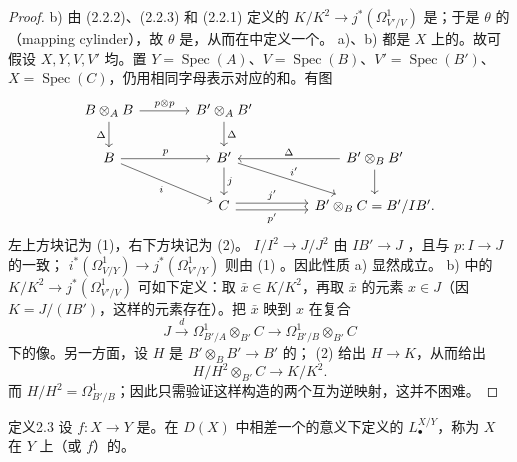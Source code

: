 \begin{proof}
b) 由 (2.2.2)、(2.2.3) 和 (2.2.1) 定义的 $K/K^2\to j^*(\Omega^1_{V'/V})$ 是；于是 $\theta$ 的（mapping cylinder），故 $\theta$ 是，从而在中定义一个。
a)、b) 都是 $X$ 上的。故可假设 $X,Y,V,V'$ 均。置 $Y=\operatorname{Spec}(A)$、$V=\operatorname{Spec}(B)$、$V'=\operatorname{Spec}(B')$、$X=\operatorname{Spec}(C)$，仍用相同字母表示对应的和。有图
\[
\begin{tikzcd}[column sep=large]
B\otimes_AB\arrow[r,"p\otimes p"]\arrow[d,"\Delta"']&B'\otimes_AB'\arrow[d,"\Delta"]\\
B\arrow[r,"p"]\arrow[dr,"i"']&B'\arrow[d,"j"]\arrow[dr,"i'"]&B'\otimes_BB'\arrow[l,"\Delta"']\arrow[d]\\
&C\arrow[r,"j'",shift left]\arrow[r,"p'"',shift right]&B'\otimes_BC=B'/IB'.
\end{tikzcd}
\]
左上方块记为 (1)，右下方块记为 (2)。 $I/I^2\to J/J^2$ 由 $IB'\to J$ ，且与 $p:I\to J$ 的一致； $i^*(\Omega^1_{V/Y})\to j^*(\Omega^1_{V'/Y})$ 则由 (1) 。因此性质 a) 显然成立。
b) 中的 $K/K^2\to j^*(\Omega^1_{V'/V})$ 可如下定义：取 $\bar x\in K/K^2$，再取 $\bar x$ 的元素 $x\in J$（因 $K=J/(IB')$，这样的元素存在）。把 $\bar x$ 映到 $x$ 在复合
\[J\xrightarrow{d}\Omega^1_{B'/A}\otimes_{B'}C\longrightarrow\Omega^1_{B'/B}\otimes_{B'}C\]
下的像。另一方面，设 $H$ 是 $B'\otimes_BB'\to B'$ 的； (2) 给出 $H\to K$，从而给出
\[H/H^2\otimes_{B'}C\longrightarrow K/K^2.\]
而 $H/H^2=\Omega^1_{B'/B}$；因此只需验证这样构造的两个互为逆映射，这并不困难。
\end{proof}
\begin{SGAresult}{定义}{2.3}
设 $f:X\to Y$ 是。在 $D(X)$ 中相差一个的意义下定义的 $L^{X/Y}_\bullet$，称为 $X$ 在 $Y$ 上（或 $f$）的。
\end{SGAresult}
